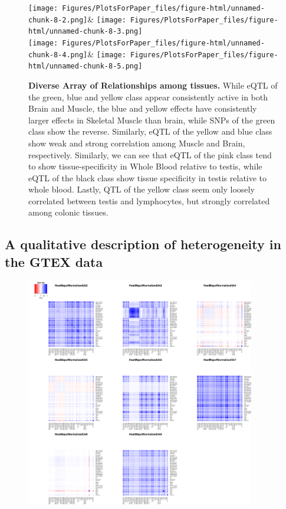 \begin{figure}[htbp]
\texttt{[image: Figures/PlotsForPaper\_files/figure-html/unnamed-chunk-8-2.png]}&
\texttt{[image: Figures/PlotsForPaper\_files/figure-html/unnamed-chunk-8-3.png]}\\
\hfill
\texttt{[image: Figures/PlotsForPaper\_files/figure-html/unnamed-chunk-8-4.png]}&
\texttt{[image: Figures/PlotsForPaper\_files/figure-html/unnamed-chunk-8-5.png]}
\caption{\textbf {Diverse Array of Relationships among tissues.} While eQTL of the green, blue and yellow class appear consistently active in both Brain and Muscle, the blue and yellow effects have consistently larger effects in Skeletal Muscle than brain, while SNPs of the green class show the reverse. Similarly, eQTL of the yellow and blue class show weak and strong correlation among Muscle and Brain, respectively. Similarly, we can see that eQTL of the pink class tend to show tissue-specificity in Whole Blood relative to testis, while eQTL of the black class show tissue specificity in testis relative to whole blood. Lastly, QTL of the yellow class seem only loosely correlated between testis and lymphocytes, but strongly correlated among colonic tissues.}
\label{fig:twoplot}
\end{figure}


\subsection{A qualitative description of heterogeneity in the GTEX data}
\begin{figure}[htbp]
\includegraphics[width=10cm]{Figures/gtexresultcompiledheatmaps.png}
\label{fig:allheat}
\end{figure}\newline

